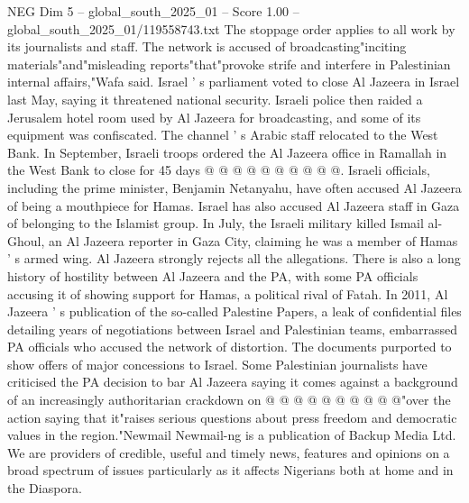 \begin{textsample}{NEG Dim 5 – global\_south\_2025\_01 – Score 1.00 – global\_south\_2025\_01/119558743.txt}
The stoppage order applies to all work by its journalists and staff.
The network is accused of broadcasting"inciting materials"and"misleading reports"that"provoke strife and interfere in Palestinian internal affairs,"Wafa said.
Israel ' s parliament voted to close Al Jazeera in Israel last May, saying it threatened national security.
Israeli police then raided a Jerusalem hotel room used by Al Jazeera for broadcasting, and some of its equipment was confiscated.
The channel ' s Arabic staff relocated to the West Bank.
In September, Israeli troops ordered the Al Jazeera office in Ramallah in the West Bank to close for 45 days @ @ @ @ @ @ @ @ @ @.
Israeli officials, including the prime minister, Benjamin Netanyahu, have often accused Al Jazeera of being a mouthpiece for Hamas.
Israel has also accused Al Jazeera staff in Gaza of belonging to the Islamist group.
In July, the Israeli military killed Ismail al-Ghoul, an Al Jazeera reporter in Gaza City, claiming he was a member of Hamas ' s armed wing.
Al Jazeera strongly rejects all the allegations.
There is also a long history of hostility between Al Jazeera and the PA, with some PA officials accusing it of showing support for Hamas, a political rival of Fatah.
In 2011, Al Jazeera ' s publication of the so-called Palestine Papers, a leak of confidential files detailing years of negotiations between Israel and Palestinian teams, embarrassed PA officials who accused the network of distortion.
The documents purported to show offers of major concessions to Israel.
Some Palestinian journalists have criticised the PA decision to bar Al Jazeera saying it comes against a background of an increasingly authoritarian crackdown on @ @ @ @ @ @ @ @ @ @"over the action saying that it"raises serious questions about press freedom and democratic values in the region."Newmail Newmail-ng is a publication of Backup Media Ltd.
We are providers of credible, useful and timely news, features and opinions on a broad spectrum of issues particularly as it affects Nigerians both at home and in the Diaspora.

\end{textsample}
